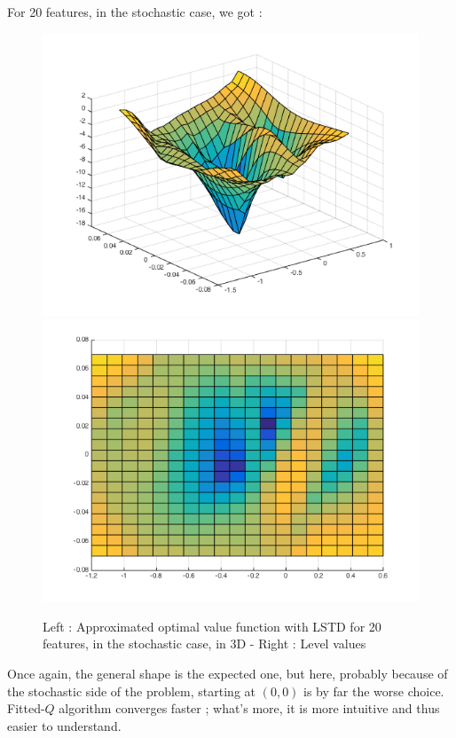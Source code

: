 \documentclass[a4paper, 12pt]{article}
\begin{document}
For 20 features, in the stochastic case, we got :
\begin{figure}[H]
	\centering
	\noindent\includegraphics[scale=0.3]{lstd-20feat-stoch.png}
	\noindent\includegraphics[scale=0.3]{lstd-20feat-stoch-flat.png}
	\caption{Left : Approximated optimal value function with LSTD for 20 features, in the stochastic case, in 3D - Right : Level values}
\end{figure}
Once again, the general shape is the expected one, but here, probably because of the stochastic side of the problem, starting at $(0, 0)$ is by far the worse choice.
\\[5mm]
Fitted-$Q$ algorithm converges faster ; what's more, it is more intuitive and thus easier to understand.
\end{document}
